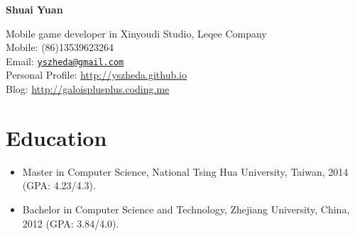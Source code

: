 \documentclass[letterpaper]{article}
\def\name{Shuai Yuan}
\begin{document}
\centerline{\huge\bf \name} \vspace{0.25in}
\begin{minipage}[t]{0.8\textwidth}
    Mobile game developer in Xinyoudi Studio, Leqee Company \\
    Mobile: (86)13539623264   \\
    Email: \href{mailto:yszheda@gmail.com}{\tt yszheda@gmail.com}\\
    Personal Profile: \url{http://yszheda.github.io} \\
    Blog: \url{http://galoisplusplus.coding.me}
\end{minipage}

\section*{Education}
\begin{itemize}
    \item Master in Computer Science, National Tsing Hua University, Taiwan, 2014 (GPA: 4.23/4.3).
    \item Bachelor in Computer Science and Technology, Zhejiang University, China, 2012 (GPA: 3.84/4.0).
\end{itemize}
\end{document}
